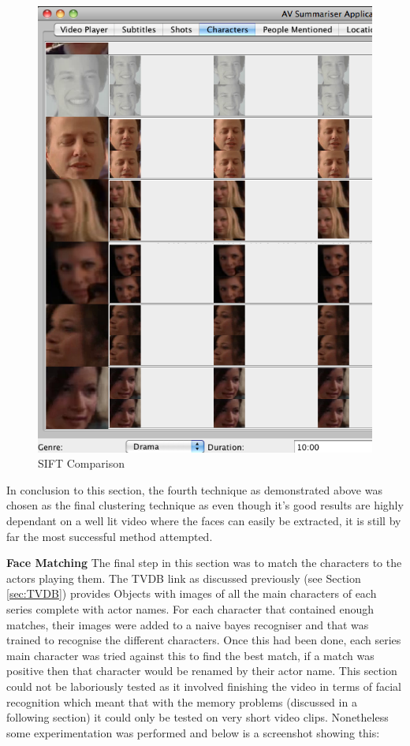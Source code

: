 \begin{figure}[h1]
\begin{minipage}[b]{0.5\linewidth}
 \includegraphics[trim = 0mm 0mm 0mm 0mm, clip,
 scale=0.38]{Images/SIFT2.png}
  \caption{SIFT Comparison}
\end{minipage}
\end{figure}

In conclusion to this section, the fourth technique as demonstrated above was chosen as the final clustering technique as even though it's good results are highly dependant on a well lit video where the faces can easily be extracted, it is still by far the most successful method attempted.

\newpage
\textbf{Face Matching}
\newline
The final step in this section was to match the characters to the actors playing them. The TVDB link as discussed previously (see Section \ref{sec:TVDB}) provides Objects with images of all the main characters of each 
series complete with actor names. For each character that contained enough matches, their images were added to a naive bayes recogniser and that 
was trained to recognise the different characters. Once this had been done, each series main character was tried against this to find the best match, 
if a match was positive then that character would be renamed by their actor name. This section could not be laboriously tested as it involved finishing 
the video in terms of facial recognition which meant that with the memory problems (discussed in a following section) it could only be tested on very short video clips. Nonetheless some experimentation was performed and below is a screenshot showing this:

